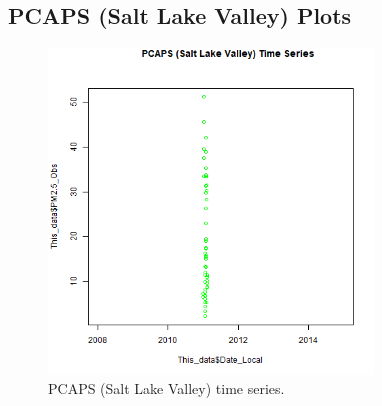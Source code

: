 
\subsection{PCAPS (Salt Lake Valley) Plots}
\begin{figure} 
\centering 
\includegraphics[width=0.77\textwidth]{Code_Outputs/PCAPS_time_series.png} 
\caption{\label{fig:PCAPSTS}PCAPS (Salt Lake Valley) time series.} 
\end{figure} 
 
